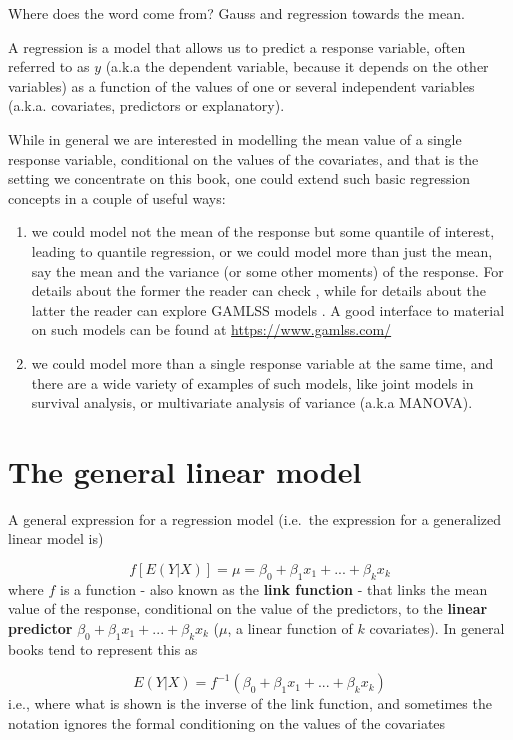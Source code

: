 \documentclass[
]{book}
\begin{document}
Where does the word come from? Gauss and regression towards the mean.

A regression is a model that allows us to predict a response variable, often referred to as \(y\) (a.k.a the dependent variable, because it depends on the other variables) as a function of the values of one or several independent variables (a.k.a. covariates, predictors or explanatory).

While in general we are interested in modelling the mean value of a single response variable, conditional on the values of the covariates, and that is the setting we concentrate on this book, one could extend such basic regression concepts in a couple of useful ways:

\begin{enumerate}
\def\labelenumi{\arabic{enumi}.}
\item
  we could model not the mean of the response but some quantile of interest, leading to quantile regression, or we could model more than just the mean, say the mean and the variance (or some other moments) of the response. For details about the former the reader can check \citet{Cade2003}, while for details about the latter the reader can explore GAMLSS models \citet{Stasinopoulos2017}. A good interface to material on such models can be found at \url{https://www.gamlss.com/}
\item
  we could model more than a single response variable at the same time, and there are a wide variety of examples of such models, like joint models in survival analysis, or multivariate analysis of variance (a.k.a MANOVA).
\end{enumerate}

\section{The general linear model}\label{the-general-linear-model}

A general expression for a regression model (i.e.~the expression for a generalized linear model is)

\[ f[E(Y|X)] = \mu = \beta_0+\beta_1 x_1 + ... + \beta_k x_k \]
where \(f\) is a function - also known as the \textbf{link function} - that links the mean value of the response, conditional on the value of the predictors, to the \textbf{linear predictor} \(\beta_0+\beta_1 x_1 + ... + \beta_k x_k\) (\(\mu\), a linear function of \(k\) covariates). In general books tend to represent this as

\[ E(Y|X) =  f^{-1}(\beta_0+\beta_1 x_1 + ... + \beta_k x_k) \]
i.e., where what is shown is the inverse of the link function,
and sometimes the notation ignores the formal conditioning on the values of the covariates
\end{document}
